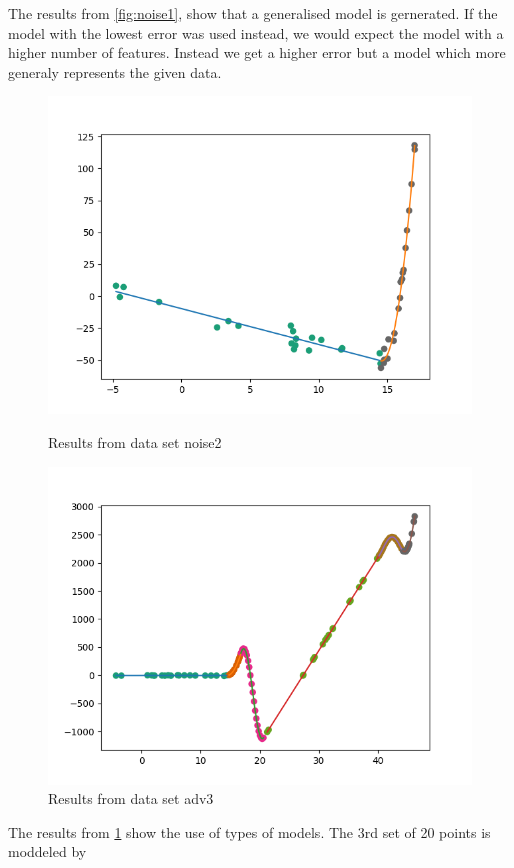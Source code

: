 \documentclass[]{article}
\begin{document}
The results from \ref{fig:noise1}, show that a generalised model is gernerated. If
the model with the lowest error was used instead, we would expect the model with
a higher number of features. Instead we get a higher error but a model which
more generaly represents the given data.

\begin{figure}[!tbph]
  \centering
  \begin{minipage}[b]{0.45\textwidth}
    \includegraphics[width=\textwidth]{noise2.png}
    \caption {Results from data set noise2}
    \label{fig:noise2}
  \end{minipage}
  \hfill
  \begin{minipage}[b]{0.45\textwidth}
    \includegraphics[width=\textwidth]{adv3.png}
    \caption {Results from data set adv3}
    \label{fig:adv3}
  \end{minipage}

\end{figure}


The results from \ref{fig:adv3} show the use of types of models. The
3rd set of 20 points is moddeled by  
\end{document}

